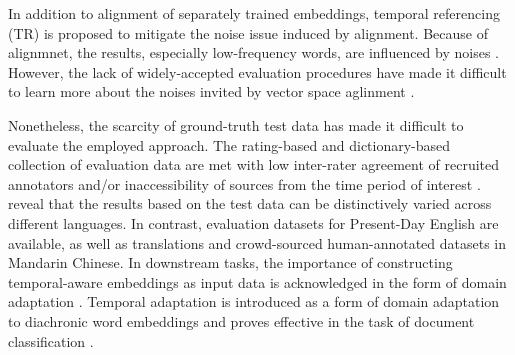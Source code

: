 In addition to alignment of separately trained embeddings, temporal referencing (TR) \parencite{dubossarsky2019timeforchange} is proposed to mitigate the noise issue induced by alignment. Because of alignmnet, the results, especially low-frequency words, are influenced by noises \parencite{dubossarsky2019timeforchange,dubossarsky2019timeout}. However, the lack of widely-accepted evaluation procedures have made it difficult to learn more about the noises invited by vector space aglinment \parencite{dubossarsky2019timeout}.

Nonetheless, the scarcity of ground-truth test data has made it difficult to evaluate the employed approach. The rating-based and dictionary-based collection of evaluation data are met with low inter-rater agreement of recruited annotators and/or inaccessibility of sources from the time period of interest \parencite{tang2018state}. \textcite{kutuzov2020uio} reveal that the results based on the test data can be distinctively varied across different languages. In contrast, evaluation datasets for Present-Day English are available, as well as translations and crowd-sourced human-annotated datasets in Mandarin Chinese. In downstream tasks, the importance of constructing temporal-aware embeddings as input data is acknowledged in the form of domain adaptation \parencite{huang2019neural}. Temporal adaptation is introduced as a form of domain adaptation to diachronic word embeddings and proves effective in the task of document classification \parencite{huang2019neural}.  %


